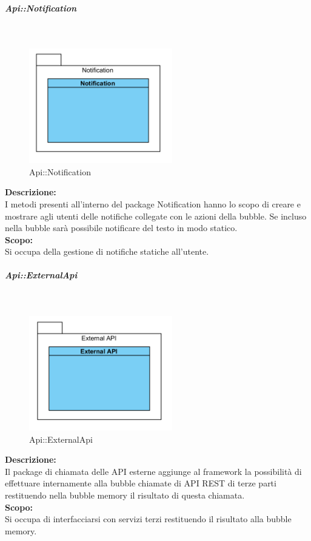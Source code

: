\begin{samepage}
\subparagraph{Api\-::Notification}\label{api-notifica}\mbox{}\\
\nopagebreak
\begin{figure}[H]
	\centering
	\includegraphics[height=5cm]{diagrammi_img/classi_e_package/api_notifica.png}
	\caption{Api\-::Notification}
\end{figure}
\end{samepage}
\textbf{Descrizione:}\\ 
I metodi presenti all'interno del package Notification hanno lo scopo di creare e mostrare agli utenti delle notifiche collegate con le azioni della bubble. Se incluso nella bubble sarà possibile notificare del testo in modo statico.\\
\textbf{Scopo:}\\
Si occupa della gestione di notifiche statiche all'utente.\\

\begin{samepage}
\subparagraph{Api\-::External\-Api}\label{api-esterne}\mbox{}\\
\nopagebreak
\begin{figure}[H]
	\centering
	\includegraphics[height=5cm]{diagrammi_img/classi_e_package/api_esterne.png}
	\caption{Api\-::External\-Api}
\end{figure}
\end{samepage}
\textbf{Descrizione:}\\ 
Il package di chiamata delle API esterne aggiunge al framework la possibilità di effettuare internamente alla bubble chiamate di API REST di terze parti restituendo nella bubble memory il risultato di questa chiamata. \\
\textbf{Scopo:}\\
Si occupa di interfacciarsi con servizi terzi restituendo il risultato alla bubble memory.\\

